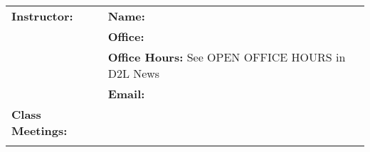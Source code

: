 \documentclass[11pt]{article}
\begin{document}
\begin{longtable}{lp{5.2in}}
%
\textbf{Instructor:}
      & {\bf Name:}         %
     \\
      & {\bf Office:}       %
     \\
      & {\bf Office Hours:} \hspace{.20ex} See OPEN OFFICE HOURS in D2L News
     \\
      & {\bf Email:}        %
     \\[6pt]
%

\textbf{Class Meetings:}
     &    %
     \\
     &    %
   \\[6pt]


\end{longtable}
\end{document}

